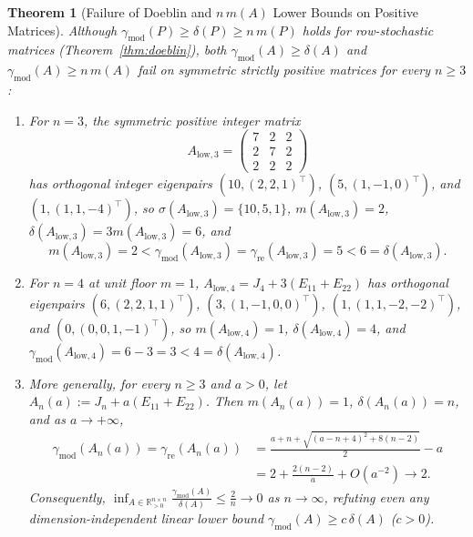 \documentclass[11pt]{article}
\newtheorem{theorem}{Theorem}[section]
\theoremstyle{definition}
\newcommand{\R}{\mathbb{R}}
\begin{document}
\begin{theorem}[Failure of Doeblin and $n\,m(A)$ Lower Bounds on Positive Matrices]\label{thm:doeblin-fail}
Although $\gamma_{\mathrm{mod}}(P) \ge \delta(P) \ge n\,m(P)$ holds for row-stochastic matrices (Theorem~\ref{thm:doeblin}), both $\gamma_{\mathrm{mod}}(A) \ge \delta(A)$ and $\gamma_{\mathrm{mod}}(A) \ge n\,m(A)$ fail on symmetric strictly positive matrices for every $n \ge 3$:
\begin{enumerate}
  \item[(a)] For $n = 3$, the symmetric positive integer matrix
    \[
      A_{\mathrm{low},3} = \begin{pmatrix} 7 & 2 & 2 \\ 2 & 7 & 2 \\ 2 & 2 & 2 \end{pmatrix}
    \]
    has orthogonal integer eigenpairs $(10, (2,2,1)^\top)$, $(5, (1,-1,0)^\top)$, and $(1, (1,1,-4)^\top)$, so $\sigma(A_{\mathrm{low},3}) = \{10, 5, 1\}$, $m(A_{\mathrm{low},3}) = 2$, $\delta(A_{\mathrm{low},3}) = 3 m(A_{\mathrm{low},3}) = 6$, and
    \[
      m(A_{\mathrm{low},3}) = 2 < \gamma_{\mathrm{mod}}(A_{\mathrm{low},3}) = \gamma_{\mathrm{re}}(A_{\mathrm{low},3}) = 5 < 6 = \delta(A_{\mathrm{low},3}).
    \]
  \item[(b)] For $n = 4$ at unit floor $m = 1$, $A_{\mathrm{low},4} = J_4 + 3(E_{11} + E_{22})$ has orthogonal eigenpairs $(6, (2,2,1,1)^\top)$, $(3, (1,-1,0,0)^\top)$, $(1, (1,1,-2,-2)^\top)$, and $(0, (0,0,1,-1)^\top)$, so $m(A_{\mathrm{low},4}) = 1$, $\delta(A_{\mathrm{low},4}) = 4$, and $\gamma_{\mathrm{mod}}(A_{\mathrm{low},4}) = 6 - 3 = 3 < 4 = \delta(A_{\mathrm{low},4})$.
  \item[(c)] More generally, for every $n \ge 3$ and $a > 0$, let $A_n(a) := J_n + a(E_{11} + E_{22})$. Then $m(A_n(a)) = 1$, $\delta(A_n(a)) = n$, and as $a \to +\infty$,
    \begin{align*}
      \gamma_{\mathrm{mod}}(A_n(a)) = \gamma_{\mathrm{re}}(A_n(a))
      &= \frac{a + n + \sqrt{(a - n + 4)^2 + 8(n - 2)}}{2} - a \\
      &= 2 + \frac{2(n - 2)}{a} + O(a^{-2}) \longrightarrow 2.
    \end{align*}
    Consequently, $\inf_{A \in \R^{n \times n}_{>0}} \frac{\gamma_{\mathrm{mod}}(A)}{\delta(A)} \le \frac{2}{n} \to 0$ as $n \to \infty$, refuting even any dimension-independent linear lower bound $\gamma_{\mathrm{mod}}(A) \ge c\,\delta(A)$ ($c > 0$).
\end{enumerate}
\end{theorem}
\end{document}
